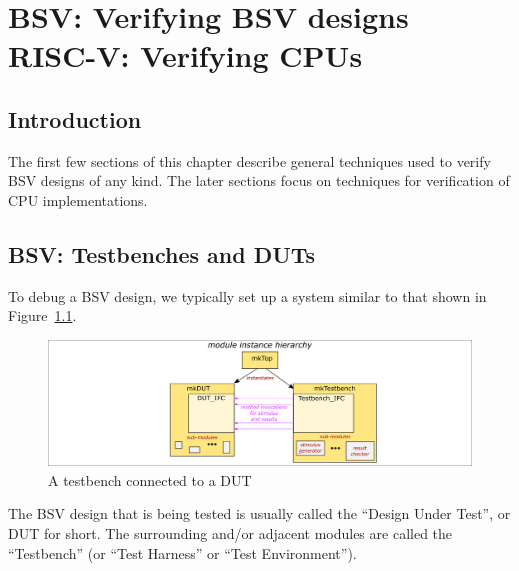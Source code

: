 

\chapter{BSV: Verifying BSV designs \\
RISC-V: Verifying CPUs}


\setcounter{page}{1}
\renewcommand{\thepage}{\arabic{chapter}-\arabic{page}}

\label{ch_Drum_Sim_Top}


\section{Introduction}

The first few sections of this chapter describe general techniques
used to verify BSV designs of any kind.  The later sections focus on
techniques for verification of CPU implementations.


\section{BSV: Testbenches and DUTs}


To debug a BSV design, we typically set up a system similar to that
shown in Figure~\ref{Fig_Testbench_DUT}.
\begin{figure}[htbp]
  \centerline{\includegraphics[width=6in,angle=0]{Figures/Fig_Testbench_DUT}}
  \caption{\label{Fig_Testbench_DUT}
           A testbench connected to a DUT}
\end{figure}
The BSV design that is being tested is usually called the ``Design
Under Test'', or DUT for short.  The surrounding and/or adjacent
modules are called the ``Testbench'' (or ``Test Harness'' or ``Test
Environment'').

